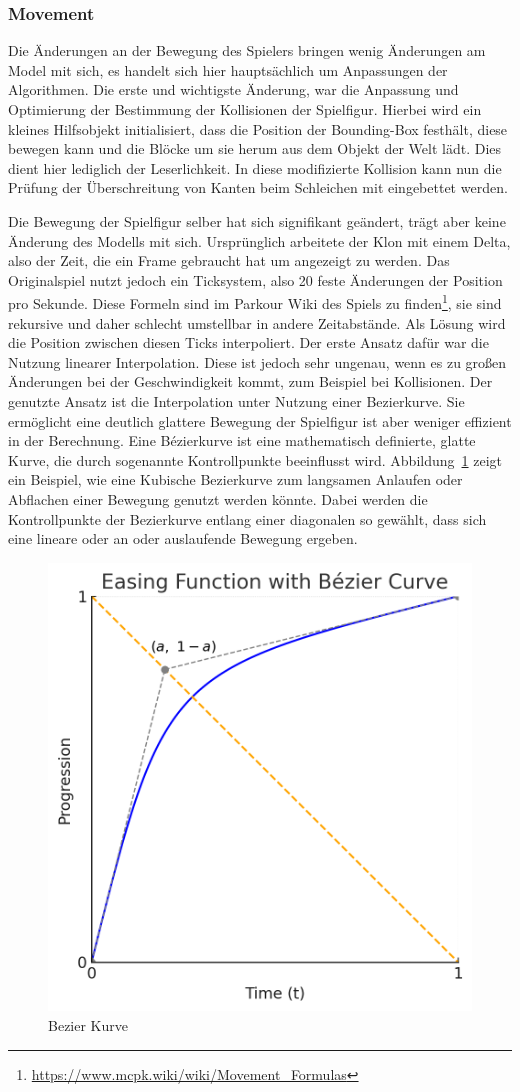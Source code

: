 \documentclass{article}
\begin{document}
\subsubsection{Movement}

Die Änderungen an der Bewegung des Spielers bringen wenig Änderungen am Model mit sich, es handelt sich hier hauptsächlich um Anpassungen der Algorithmen. Die erste und wichtigste Änderung, war die Anpassung und Optimierung der Bestimmung der Kollisionen der Spielfigur. Hierbei wird ein kleines Hilfsobjekt initialisiert, dass die Position der Bounding-Box festhält, diese bewegen kann und die Blöcke um sie herum aus dem Objekt der Welt lädt. Dies dient hier lediglich der Leserlichkeit. In diese modifizierte Kollision kann nun die Prüfung der Überschreitung von Kanten beim Schleichen mit eingebettet werden. 

Die Bewegung der Spielfigur selber hat sich signifikant geändert, trägt aber keine Änderung des Modells mit sich. Ursprünglich arbeitete der Klon mit einem Delta, also der Zeit, die ein Frame gebraucht hat um angezeigt zu werden. Das Originalspiel nutzt jedoch ein Ticksystem, also 20 feste Änderungen der Position pro Sekunde. Diese Formeln sind im Parkour Wiki des Spiels zu finden\footnote{\url{https://www.mcpk.wiki/wiki/Movement_Formulas}}, sie sind rekursive und daher schlecht umstellbar in andere Zeitabstände. Als Lösung wird die Position zwischen diesen Ticks interpoliert. Der erste Ansatz dafür war die Nutzung linearer Interpolation. Diese ist jedoch sehr ungenau, wenn es zu großen Änderungen bei der Geschwindigkeit kommt, zum Beispiel bei Kollisionen. Der genutzte Ansatz ist die Interpolation unter Nutzung einer Bezierkurve. Sie ermöglicht eine deutlich glattere Bewegung der Spielfigur ist aber weniger effizient in der Berechnung. Eine Bézierkurve ist eine mathematisch definierte, glatte Kurve, die durch sogenannte Kontrollpunkte beeinflusst wird. Abbildung~\ref{pic:bezier} zeigt ein Beispiel, wie eine Kubische Bezierkurve zum langsamen Anlaufen oder Abflachen einer Bewegung genutzt werden könnte. Dabei werden die Kontrollpunkte der Bezierkurve entlang einer diagonalen so gewählt, dass sich eine lineare oder an oder auslaufende Bewegung ergeben.

\begin{figure} [ht]
  \centering
  \includegraphics[width=.5\linewidth]{bezier.png}
  \caption{Bezier Kurve}
  \label{pic:bezier}
\end{figure}
\end{document}
